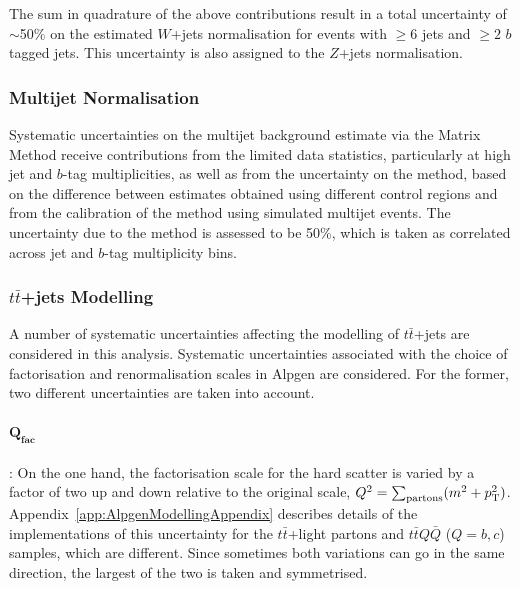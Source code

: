 The sum in quadrature of the above contributions result in a total uncertainty of $\sim$50\% on
the estimated $W$+jets normalisation for events with $\geq 6$ jets and $\geq 2$ $b$ tagged jets. 
This uncertainty is also assigned to the $Z$+jets normalisation.

\subsubsection{Multijet Normalisation}
\label{sec:qcd_normHTX}
Systematic uncertainties on the multijet background estimate via the Matrix Method receive
contributions from the limited data statistics, particularly at high jet and $b$-tag multiplicities, as
well as from the uncertainty on the method, based on the difference between estimates obtained using 
different control regions and from the calibration of the method using simulated multijet events.
The uncertainty due to the method is assessed to be 50\%, which is taken as correlated across jet
and $b$-tag multiplicity bins. 




\subsubsection{$t\bar{t}$+jets Modelling}
\label{sec:syst_ttbarmodelHTX}

A number of systematic uncertainties affecting 
the modelling of $t\bar{t}$+jets are considered
in this analysis. Systematic uncertainties associated 
with the choice of factorisation and renormalisation 
scales in {\sc Alpgen} are considered. For the former, 
two different uncertainties are taken into account.


\ifIsINT
\paragraph{$\mathbf{Q_{fac}}$}: 
\fi
On the one hand, the factorisation scale for the hard scatter is varied by a factor of two up and down relative to the
original scale, $Q^2=\sum_{\rm partons} (m^2 + \pt^2)$.
\ifIsINT 
Appendix~\ref{app:AlpgenModellingAppendix} describes details of the
implementations of this uncertainty for the $t\bar{t}$+light partons and $t\bar{t}Q\bar{Q}$ ($Q=b,c$) samples, which are different.
\fi
Since sometimes both variations can go in the same direction, the largest of the two is taken and symmetrised.
\ifIsINT
